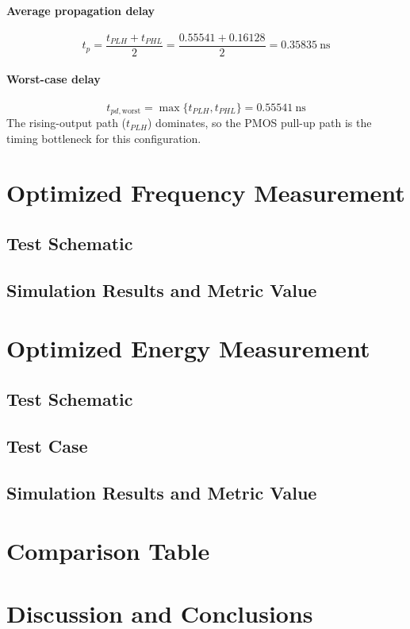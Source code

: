 \documentclass[12pt]{article}
\begin{document}
\paragraph{Average propagation delay}
\[
t_p=\frac{t_{PLH}+t_{PHL}}{2}
   =\frac{0.55541+0.16128}{2}
   =\boxed{0.35835~\text{ns}}
\]

\paragraph{Worst-case delay}
\[
t_{pd,\text{worst}}=\max\{t_{PLH},t_{PHL}\}=\boxed{0.55541~\text{ns}}
\]
The rising-output path (\(t_{PLH}\)) dominates, so the PMOS pull-up path is the timing bottleneck for this configuration.


\newpage

\section{Optimized Frequency Measurement}
\subsection{Test Schematic}



\newpage

\subsection{Simulation Results and Metric Value}



\newpage

\section{Optimized Energy Measurement}
\subsection{Test Schematic}



\newpage

\subsection{Test Case}



\newpage

\subsection{Simulation Results and Metric Value}



\newpage

\section{Comparison Table}



\newpage

\section{Discussion and Conclusions}
\end{document}

